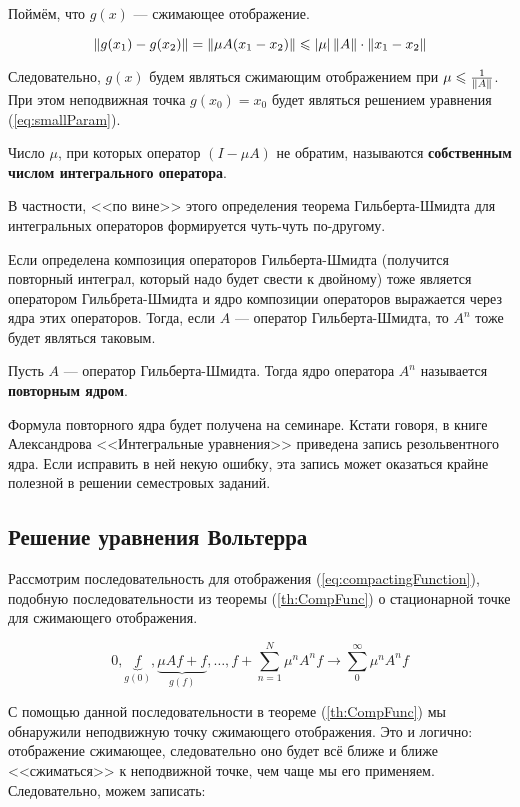 \documentclass[12pt]{article}
\begin{document}
		Поймём, что $g(x)$ --- сжимающее отображение.
	
		$$\left\| g(x_1) - g(x_2) \right\| = \left\| \mu A(x_1 - x_2) \right\| \leqslant \left| \mu \right| \left\| A \right\| \cdot \left\| x_1 - x_2 \right\|$$
	
		Следовательно, $g(x)$ будем являться сжимающим отображением при $\mu \leqslant \frac{1}{\left\| A \right\|}$. При этом
		неподвижная точка $g(x_0) = x_0$ будет являться решением уравнения (\ref{eq:smallParam}).
	
		\begin{defi}
			Число $\mu$, при которых оператор $(I - \mu A)$ не обратим, называются \textbf{собственным числом
			интегрального оператора}.
		\end{defi}
	
		В частности, <<по вине>> этого определения теорема Гильберта-Шмидта для интегральных операторов формируется
		чуть-чуть по-другому.
	
		Если определена композиция операторов Гильберта-Шмидта (получится повторный интеграл, который надо будет 
		свести к двойному) тоже является оператором Гильбрета-Шмидта и ядро композиции операторов выражается 
		через ядра этих операторов. Тогда, если $A$ --- оператор Гильберта-Шмидта, то $A^n$ тоже будет являться
		таковым.
	
		\begin{defi}
			Пусть $A$ --- оператор Гильберта-Шмидта. Тогда ядро оператора $A^n$ называется \textbf{повторным ядром}.
		\end{defi}
	
		{\footnotesize
		Формула повторного ядра будет получена на семинаре. Кстати говоря, в книге Александрова <<Интегральные уравнения>>
		приведена запись резольвентного ядра. Если исправить в ней некую ошибку, эта запись может оказаться крайне полезной
		в решении семестровых заданий.\par
		}

	\subsection{Решение уравнения Вольтерра}

		Рассмотрим последовательность для отображения (\ref{eq:compactingFunction}), подобную последовательности
		из теоремы (\ref{th:CompFunc}) о стационарной точке для сжимающего отображения.
	
		$$0, \underbrace{f}_{g(0)}, \underbrace{\mu Af + f}_{g(f)}, \ldots, f + \sum_{n=1}^N \mu^nA^nf \rightarrow \sum_0^{\infty} \mu^nA^n f$$

		С помощью данной последовательности в теореме (\ref{th:CompFunc}) мы обнаружили неподвижную точку сжимающего отображения. {\color{gray} Это и логично: отображение сжимающее, следовательно оно будет всё ближе и ближе <<сжиматься>> к неподвижной точке, чем чаще мы его применяем.} Следовательно, можем записать:
\end{document}
